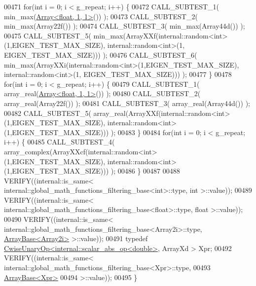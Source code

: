 \begin{DoxyCode}
00471   \textcolor{keywordflow}{for}(\textcolor{keywordtype}{int} i = 0; i < g\_repeat; i++) \{
00472     CALL\_SUBTEST\_1( min\_max(\hyperlink{group___core___module_class_eigen_1_1_array}{Array<float, 1, 1>}()) );
00473     CALL\_SUBTEST\_2( min\_max(Array22f()) );
00474     CALL\_SUBTEST\_3( min\_max(Array44d()) );
00475     CALL\_SUBTEST\_5( min\_max(ArrayXXf(internal::random<int>(1,EIGEN\_TEST\_MAX\_SIZE), internal::random<int>(1,
      EIGEN\_TEST\_MAX\_SIZE))) );
00476     CALL\_SUBTEST\_6( min\_max(ArrayXXi(internal::random<int>(1,EIGEN\_TEST\_MAX\_SIZE), internal::random<int>(1,
      EIGEN\_TEST\_MAX\_SIZE))) );
00477   \}
00478   \textcolor{keywordflow}{for}(\textcolor{keywordtype}{int} i = 0; i < g\_repeat; i++) \{
00479     CALL\_SUBTEST\_1( array\_real(\hyperlink{group___core___module_class_eigen_1_1_array}{Array<float, 1, 1>}()) );
00480     CALL\_SUBTEST\_2( array\_real(Array22f()) );
00481     CALL\_SUBTEST\_3( array\_real(Array44d()) );
00482     CALL\_SUBTEST\_5( array\_real(ArrayXXf(internal::random<int>(1,EIGEN\_TEST\_MAX\_SIZE), internal::random<int>
      (1,EIGEN\_TEST\_MAX\_SIZE))) );
00483   \}
00484   \textcolor{keywordflow}{for}(\textcolor{keywordtype}{int} i = 0; i < g\_repeat; i++) \{
00485     CALL\_SUBTEST\_4( array\_complex(ArrayXXcf(internal::random<int>(1,EIGEN\_TEST\_MAX\_SIZE), 
      internal::random<int>(1,EIGEN\_TEST\_MAX\_SIZE))) );
00486   \}
00487 
00488   VERIFY((internal::is\_same< internal::global\_math\_functions\_filtering\_base<int>::type, \textcolor{keywordtype}{int} >::value));
00489   VERIFY((internal::is\_same< internal::global\_math\_functions\_filtering\_base<float>::type, \textcolor{keywordtype}{float} >::value));
00490   VERIFY((internal::is\_same< internal::global\_math\_functions\_filtering\_base<Array2i>::type, 
      \hyperlink{group___core___module_class_eigen_1_1_array_base}{ArrayBase<Array2i>} >::value));
00491   \textcolor{keyword}{typedef} \hyperlink{group___core___module_class_eigen_1_1_cwise_unary_op}{CwiseUnaryOp<internal::scalar\_abs\_op<double>}, ArrayXd
       > Xpr;
00492   VERIFY((internal::is\_same< internal::global\_math\_functions\_filtering\_base<Xpr>::type,
00493                            \hyperlink{group___core___module_class_eigen_1_1_array_base}{ArrayBase<Xpr>}
00494                          >::value));
00495 \}
\end{DoxyCode}
